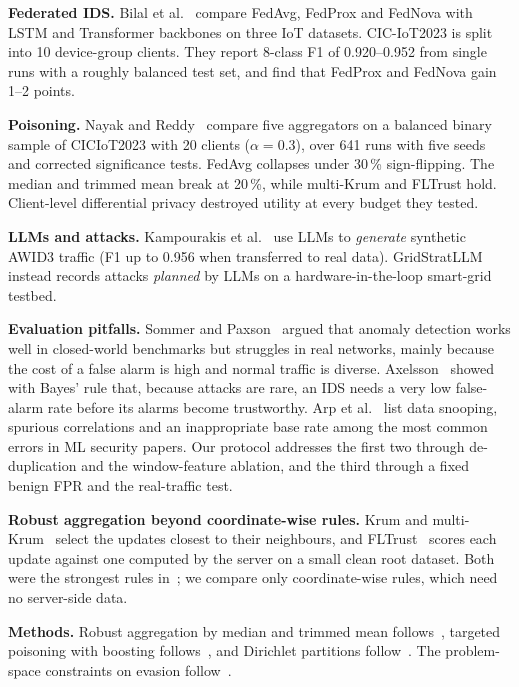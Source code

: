 \documentclass[conference]{IEEEtran}
\begin{document}
\textbf{Federated IDS.} Bilal et al.~\cite{bilal2026dataset} compare FedAvg, FedProx and FedNova with LSTM and Transformer backbones on three IoT datasets. CIC-IoT2023 is split into 10 device-group clients. They report 8-class F1 of 0.920--0.952 from single runs with a roughly balanced test set, and find that FedProx and FedNova gain 1--2 points.

\textbf{Poisoning.} Nayak and Reddy~\cite{nayak2026byzantine} compare five aggregators on a balanced binary sample of CICIoT2023 with 20 clients ($\alpha=0.3$), over 641 runs with five seeds and corrected significance tests. FedAvg collapses under 30\,\% sign-flipping. The median and trimmed mean break at 20\,\%, while multi-Krum and FLTrust hold. Client-level differential privacy destroyed utility at every budget they tested.

\textbf{LLMs and attacks.} Kampourakis et al.~\cite{kampourakis2026k2d} use LLMs to \emph{generate} synthetic AWID3 traffic (F1 up to 0.956 when transferred to real data). GridStratLLM~\cite{kellerer2026gridstrat} instead records attacks \emph{planned} by LLMs on a hardware-in-the-loop smart-grid testbed.

\textbf{Evaluation pitfalls.} Sommer and Paxson~\cite{sommer2010closedworld} argued that anomaly detection works well in closed-world benchmarks but struggles in real networks, mainly because the cost of a false alarm is high and normal traffic is diverse. Axelsson~\cite{axelsson2000baserate} showed with Bayes' rule that, because attacks are rare, an IDS needs a very low false-alarm rate before its alarms become trustworthy. Arp et al.~\cite{arp2022dos} list data snooping, spurious correlations and an inappropriate base rate among the most common errors in ML security papers. Our protocol addresses the first two through de-duplication and the window-feature ablation, and the third through a fixed benign FPR and the real-traffic test.

\textbf{Robust aggregation beyond coordinate-wise rules.} Krum and multi-Krum~\cite{blanchard2017krum} select the updates closest to their neighbours, and FLTrust~\cite{cao2021fltrust} scores each update against one computed by the server on a small clean root dataset. Both were the strongest rules in~\cite{nayak2026byzantine}; we compare only coordinate-wise rules, which need no server-side data.

\textbf{Methods.} Robust aggregation by median and trimmed mean follows~\cite{yin2018byzantine}, targeted poisoning with boosting follows~\cite{bagdasaryan2020backdoor,sun2019backdoor}, and Dirichlet partitions follow~\cite{hsu2019noniid}. The problem-space constraints on evasion follow~\cite{apruzzese2022realistic,pierazzi2020problemspace}.
\end{document}
